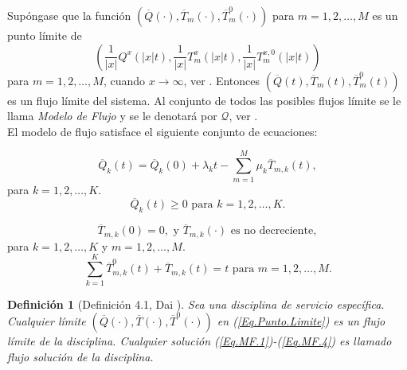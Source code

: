 \documentclass{article}
\newtheorem{Def}{Definición}[section]
\numberwithin{equation}{section}
\begin{document}
Sup\'ongase que la funci\'on $\left(\overline{Q}\left(\cdot\right),\overline{T}_{m} \left(\cdot\right),\overline{T}_{m}^{0} \left(\cdot\right)\right)$
para $m=1,2,\ldots,M$ es un punto l\'imite de
\begin{equation}\label{Eq.Punto.Limite}
\left(\frac{1}{|x|}Q^{x}\left(|x|t\right),\frac{1}{|x|}T_{m}^{x}\left(|x|t\right),\frac{1}{|x|}T_{m}^{x,0}\left(|x|t\right)\right)
\end{equation}
para $m=1,2,\ldots,M$, cuando $x\rightarrow\infty$, ver \cite{Down}. Entonces $\left(\overline{Q}\left(t\right),\overline{T}_{m} \left(t\right),\overline{T}_{m}^{0} \left(t\right)\right)$ es un flujo l\'imite del sistema. Al conjunto de todos las posibles flujos l\'imite se le llama {\emph{Modelo de Flujo}} y se le denotar\'a por $\mathcal{Q}$, ver \cite{Down, Dai, DaiSean}.\\

El modelo de flujo satisface el siguiente conjunto de ecuaciones:

\begin{equation}\label{Eq.MF.1}
\overline{Q}_{k}\left(t\right)=\overline{Q}_{k}\left(0\right)+\lambda_{k}t-\sum_{m=1}^{M}\mu_{k}\overline{T}_{m,k}\left(t\right),
\end{equation}
para $k=1,2,\ldots,K$.\\

\begin{equation}\label{Eq.MF.2}
\overline{Q}_{k}\left(t\right)\geq0\textrm{ para }k=1,2,\ldots,K.
\end{equation}

\begin{equation}\label{Eq.MF.3}
\overline{T}_{m,k}\left(0\right)=0,\textrm{ y }\overline{T}_{m,k}\left(\cdot\right)\textrm{ es no decreciente},
\end{equation}
para $k=1,2,\ldots,K$ y $m=1,2,\ldots,M$.\\
\begin{equation}\label{Eq.MF.4}
\sum_{k=1}^{K}\overline{T}_{m,k}^{0}\left(t\right)+\overline{T}_{m,k}\left(t\right)=t\textrm{ para }m=1,2,\ldots,M.
\end{equation}


\begin{Def}[Definici\'on 4.1, Dai \cite{Dai}]\label{Def.Modelo.Flujo}
Sea una disciplina de servicio espec\'ifica. Cualquier l\'imite $\left(\overline{Q}\left(\cdot\right),\overline{T}\left(\cdot\right),\overline{T}^{0}\left(\cdot\right)\right)$ en (\ref{Eq.Punto.Limite}) es un {\em flujo l\'imite} de la disciplina. Cualquier soluci\'on (\ref{Eq.MF.1})-(\ref{Eq.MF.4}) es llamado flujo soluci\'on de la disciplina.
\end{Def}
\end{document}
